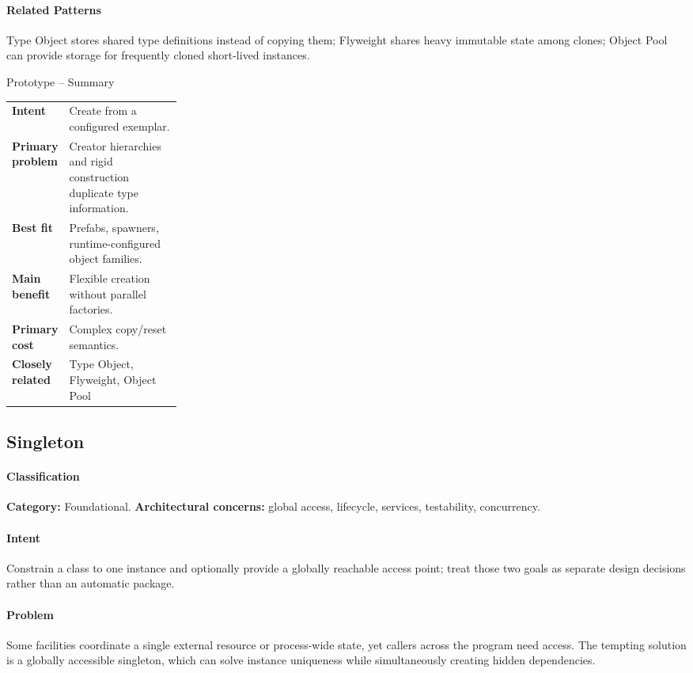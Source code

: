 \documentclass[11pt]{article}
\begin{document}
\paragraph{Related Patterns} Type Object stores shared type definitions instead of copying them; Flyweight shares heavy immutable state among clones; Object Pool can provide storage for frequently cloned short-lived instances.

\begin{patternsummary}{Prototype -- Summary}
\begin{tabularx}{\linewidth}{@{}>{\bfseries}p{0.25\linewidth}X@{}}
Intent & Create from a configured exemplar. \\
Primary problem & Creator hierarchies and rigid construction duplicate type information. \\
Best fit & Prefabs, spawners, runtime-configured object families. \\
Main benefit & Flexible creation without parallel factories. \\
Primary cost & Complex copy/reset semantics. \\
Closely related & Type Object, Flyweight, Object Pool \\
\end{tabularx}
\end{patternsummary}

\subsection{Singleton}\label{pat:singleton}
\paragraph{Classification} \textbf{Category:} Foundational. \textbf{Architectural concerns:} global access, lifecycle, services, testability, concurrency.
\paragraph{Intent} Constrain a class to one instance and optionally provide a globally reachable access point; treat those two goals as separate design decisions rather than an automatic package.
\paragraph{Problem} Some facilities coordinate a single external resource or process-wide state, yet callers across the program need access. The tempting solution is a globally accessible singleton, which can solve instance uniqueness while simultaneously creating hidden dependencies.
\end{document}
